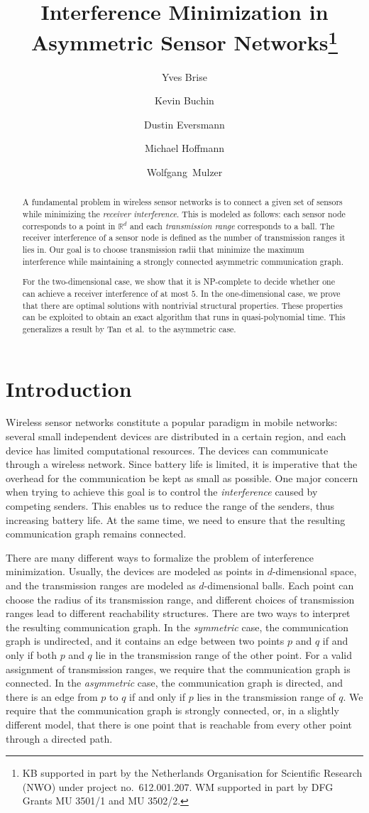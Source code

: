\documentclass[envcountsect,envcountsame,runningheads,a4paper]{llncs}
\title{Interference Minimization in Asymmetric Sensor Networks\thanks{KB supported in part by the Netherlands Organisation for Scientific 
Research (NWO) under project no.\ 612.001.207.
WM supported in part by DFG Grants MU 3501/1
and MU 3502/2.
}
}
\author{
Yves Brise\inst{1}
\and
Kevin Buchin\inst{2}
\and Dustin Eversmann\inst{3}
\and Michael Hoffmann\inst{1}
\and Wolfgang~Mulzer\inst{3}
}
\institute{
ETH Z\"urich, Switzerland,
{\tt hoffmann@inf.ethz.ch}
\and
TU Eindhoven, The Netherlands,
{\tt k.a.buchin@tue.de}
\and
FU Berlin, Germany,
{\tt mulzer@inf.fu-berlin.de}
}
\newcommand\R{{\mathbb R}}
\begin{document}
\maketitle

\begin{abstract}
A fundamental problem in wireless sensor networks is to connect
a given set of sensors while minimizing the \emph{receiver
interference}.
This is modeled as follows: each sensor node corresponds
to a point in $\R^d$ and each \emph{transmission range} corresponds
to a ball. The receiver interference of a sensor node is
defined as the number of transmission ranges it lies in.
Our goal is to choose transmission radii that
minimize the maximum interference while maintaining a
strongly connected asymmetric communication graph.

For the two-dimensional case, we show that it is NP-complete
to decide whether one can achieve a receiver interference
of at most $5$. In the one-dimensional case, we prove that there are
optimal solutions with nontrivial structural properties. These
properties can be exploited to obtain an
exact algorithm that runs in quasi-polynomial time.
This generalizes a result by Tan~et al.~to the asymmetric case.
\end{abstract}
\section{Introduction}

Wireless sensor networks constitute a popular paradigm in mobile networks:
several small independent devices are distributed in a certain region,
and each device has limited computational resources. The devices
can communicate through a wireless network. Since battery life is limited,
it is imperative that the overhead for the communication be kept as small
as possible.
One major concern when trying to achieve this goal is to control the
\emph{interference} caused by competing senders. This enables us
to reduce the range of the senders, thus increasing
battery life. At the same time, we need to
ensure that the resulting communication graph remains connected.

There are many different ways to formalize the problem of
interference minimization.  Usually, the devices are modeled as
points in $d$-dimensional space, and
the transmission ranges are modeled as $d$-dimensional balls.
Each point can choose the radius of its transmission range, and
different choices of transmission ranges lead to different
reachability structures.
There are two ways to interpret the resulting
communication graph. In the \emph{symmetric} case,
the communication graph is undirected, and it contains an edge between
two points $p$ and $q$ if and only if both $p$ and $q$ lie in the transmission
range of the other point. For a valid
assignment of transmission ranges, we require that
the communication graph is connected.
In the \emph{asymmetric} case, the communication graph is directed,
and there is an edge from $p$ to $q$ if and only if $p$ lies in the
transmission range of $q$. We require that the communication graph
is strongly connected, or, in a slightly different model,
that there is one point that is reachable from
every other point through a directed path.
\end{document}
